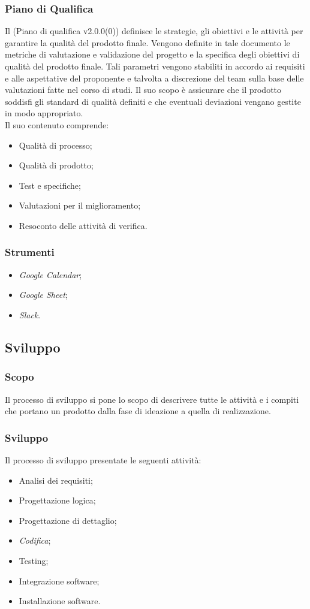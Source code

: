 \documentclass[10pt, a4paper]{article}
\begin{document}
\subsubsection{Piano di Qualifica }
Il (Piano di qualifica v2.0.0(0)) definisce le strategie, gli obiettivi e le attività per garantire la qualità del prodotto finale. Vengono definite in 
tale documento le metriche di valutazione e validazione del progetto e la specifica degli obiettivi di qualità del prodotto finale. 
Tali parametri vengono stabiliti in accordo ai requisiti e alle aspettative del proponente e talvolta a discrezione del team sulla base 
delle valutazioni fatte nel corso di studi. Il suo scopo è assicurare che il prodotto soddisfi gli standard di qualità definiti e che 
eventuali deviazioni vengano gestite in modo appropriato.\\
Il suo contenuto comprende:
\begin{itemize}
    \item Qualità di processo;
    \item Qualità di prodotto;
    \item Test e specifiche;
    \item Valutazioni per il miglioramento;
    \item Resoconto delle attività di verifica.
\end{itemize}
\subsubsection{Strumenti}
\begin{itemize}
    \item \textit{Google Calendar};
    \item \textit{Google Sheet};
    \item \textit{Slack}.
\end{itemize}

\subsection{Sviluppo}
\subsubsection{Scopo}
Il processo di sviluppo si pone lo scopo di descrivere tutte le attività e i compiti che portano un prodotto dalla fase di ideazione a quella di realizzazione. 

\subsubsection{Sviluppo}
Il processo di sviluppo presentate le seguenti attività:
\begin{itemize}
    \item Analisi dei requisiti;
    \item Progettazione logica;
    \item Progettazione di dettaglio;
    \item \textit{Codifica\pg};
    \item Testing;
    \item Integrazione software;
    \item Installazione software.
\end{itemize}
\end{document}
